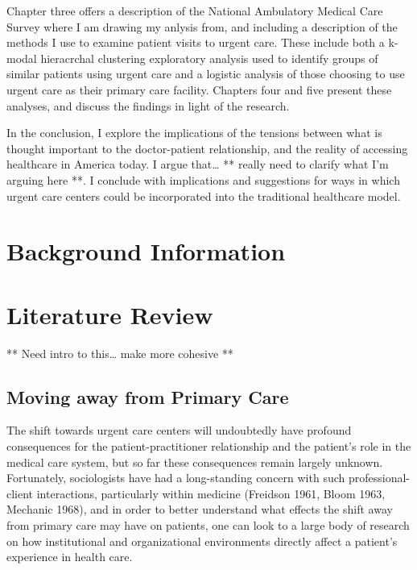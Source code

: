 \documentclass[12pt,twoside]{reedthesis}
\begin{document}
  Chapter three offers a description of the National Ambulatory Medical
  Care Survey where I am drawing my anlysis from, and including a
  description of the methods I use to examine patient visits to urgent
  care. These include both a k-modal hieracrchal clustering exploratory
  analysis used to identify groups of similar patients using urgent care
  and a logistic analysis of those choosing to use urgent care as their
  primary care facility. Chapters four and five present these analyses,
  and discuss the findings in light of the research.
  
  In the conclusion, I explore the implications of the tensions between
  what is thought important to the doctor-patient relationship, and the
  reality of accessing healthcare in America today. I argue that\ldots{}
  ** really need to clarify what I'm arguing here **. I conclude with
  implications and suggestions for ways in which urgent care centers could
  be incorporated into the traditional healthcare model.
  
  \chapter{Background Information}\label{background-information}
  
  \onehalfspacing
  
  \chapter{Literature Review}\label{literature-review}
  
  \doublespacing
  
  ** Need intro to this\ldots{} make more cohesive **
  
  \section{Moving away from Primary
  Care}\label{moving-away-from-primary-care}
  
  The shift towards urgent care centers will undoubtedly have profound
  consequences for the patient-practitioner relationship and the patient's
  role in the medical care system, but so far these consequences remain
  largely unknown. Fortunately, sociologists have had a long-standing
  concern with such professional-client interactions, particularly within
  medicine (Freidson 1961, Bloom 1963, Mechanic 1968), and in order to
  better understand what effects the shift away from primary care may have
  on patients, one can look to a large body of research on how
  institutional and organizational environments directly affect a
  patient's experience in health care.
  
\end{document}

